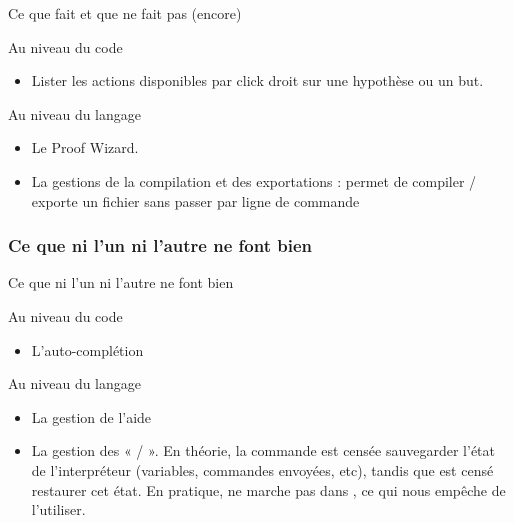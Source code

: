         \begin{frame}{Ce que \coqide{} fait et que \coquille{} ne fait pas (encore)}
            \begin{block}{Au niveau du code}
                \begin{itemize}
                    \item Lister les actions disponibles par click droit sur une hypothèse ou un but.
                \end{itemize}
            \end{block}
            \begin{block}{Au niveau du langage}
                \begin{itemize}
                    \item Le Proof Wizard.
                    \item La gestions de la compilation et des exportations : \coqide{} permet de compiler / exporte un fichier sans passer par ligne de commande
                \end{itemize}
            \end{block}
        \end{frame}

    \subsubsection{Ce que ni l'un ni l'autre ne font bien}

        \begin{frame}{Ce que ni l'un ni l'autre ne font bien}
            \begin{block}{Au niveau du code}
                \begin{itemize}
                    \item L'auto-complétion
                \end{itemize}
            \end{block}
            \begin{block}{Au niveau du langage}
                \begin{itemize}
                    \item La gestion de l'aide
                    \item La gestion des «  /  ».
                    En théorie, la commande  est censée sauvegarder l'état de l'interpréteur (variables, commandes envoyées, etc), tandis que  est censé restaurer cet état.
			        En pratique,  ne marche pas dans \coqtop{}, ce qui nous empêche de l'utiliser.
                \end{itemize}
            \end{block}
        \end{frame}

